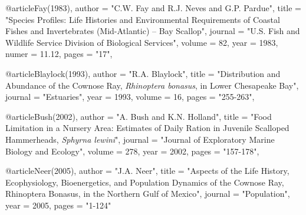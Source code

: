 @article{Fay(1983),
	author = "C.W. Fay and R.J. Neves and G.P. Pardue",
	title = "Species Profiles: Life Histories and Environmental Requirements of Coastal Fishes and Invertebrates (Mid-Atlantic) -- Bay Scallop",
	journal = "U.S. Fish and Wildlife Service Division of Biological Services",
	volume = 82,
	year = 1983,
	numer = 11.12,
	pages = "17",
}

@article{Blaylock(1993),
	author = "R.A. Blaylock",
	title = "Distribution and Abundance of the Cownose Ray, \textit{Rhinoptera bonasus}, in Lower Chesapeake Bay",
	journal = "Estuaries",
	year = 1993,
	volume = 16,
	pages = "255-263",
}

@article{Bush(2002),
	author = "A. Bush and K.N. Holland",
	title = "Food Limitation in a Nursery Area: Estimates of Daily Ration in Juvenile Scalloped Hammerheads, \textit{Sphyrna lewini}",
	journal = "Journal of Exploratory Marine Biology and Ecology",
	volume = 278,
	year = 2002,
	pages = "157-178",
}

@article{Neer(2005),
	author = "J.A. Neer",
	title = "Aspects of the Life History, Ecophysiology, Bioenergetics, and Population Dynamics of the Cownose Ray, Rhinoptera Bonasus, in the Northern Gulf of Mexico",
	journal = "Population",
	year = 2005,
	pages = "1-124"
}